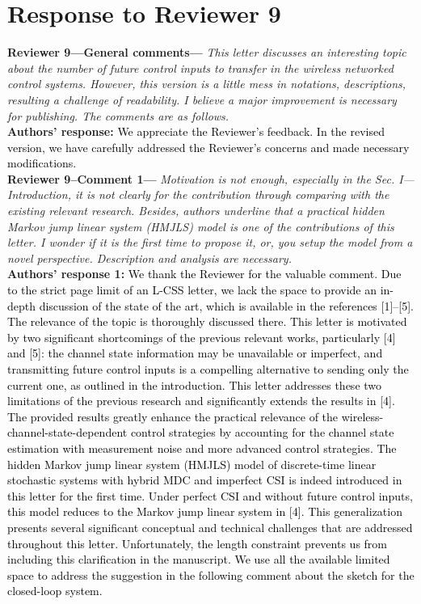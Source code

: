 \section{Response to Reviewer 9}
\textbf{Reviewer 9—General comments—}\textit{%
This letter discusses an interesting topic about the number of future control inputs to transfer in the wireless networked control systems. However, this version is a little mess in notations, descriptions, resulting a challenge of readability. I believe a major improvement is necessary for publishing. The comments are as follows.}\\[2mm]
\textbf{Authors' response:} \textcolor{black}{We appreciate the Reviewer's feedback. In the revised version, we have carefully addressed the Reviewer's concerns and made necessary modifications.}\\[4mm]
\textbf{Reviewer 9–Comment 1—}\textit{%
Motivation is not enough, especially in the Sec. I—Introduction, it is not clearly for the contribution through comparing with the existing relevant research. 
Besides, authors underline that a practical hidden Markov jump linear system (HMJLS) model is one of the contributions of this letter. 
I wonder if it is the first time to propose it, or, you setup the model from a novel perspective. Description and analysis are necessary.}\\[2mm]
\textbf{Authors' response 1:} \textcolor{black}{We thank the Reviewer for the valuable comment. Due to the strict page limit of an L-CSS letter, we lack the space to provide an in-depth discussion of the state of the art, which is available in the references [1]–[5]. The relevance of the topic is thoroughly discussed there. This letter is motivated by two significant shortcomings of the previous relevant works, particularly [4] and [5]: the channel state information may be unavailable or imperfect, and transmitting future control inputs is a compelling alternative to sending only the current one, as outlined in the introduction. This letter addresses these two limitations of the previous research and significantly extends the results in [4]. The provided results greatly enhance the practical relevance of the wireless-channel-state-dependent control strategies by accounting for the channel state estimation with measurement noise and more advanced control strategies. The hidden Markov jump linear system (HMJLS) model of discrete-time linear stochastic systems with hybrid MDC and imperfect CSI is indeed introduced in this letter for the first time. Under perfect CSI and without future control inputs, this model reduces to the Markov jump linear system in [4]. This generalization presents several significant conceptual and technical challenges that are addressed throughout this letter. Unfortunately, the length constraint prevents us from including this clarification in the manuscript. We use all the available limited space to address the suggestion in the following comment about the sketch for the closed-loop system.}\\[4mm]
